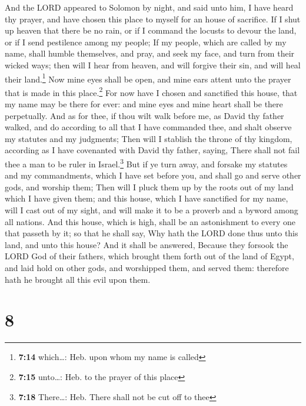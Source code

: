  And the LORD appeared to Solomon by night, and said unto
him, I have heard thy prayer, and have chosen this place to myself for
an house of sacrifice.  If I shut up heaven that there be
no rain, or if I command the locusts to devour the land, or if I send
pestilence among my people;  If my people, which are
called by my name, shall humble themselves, and pray, and seek my face,
and turn from their wicked ways; then will I hear from heaven, and will
forgive their sin, and will heal their land.\footnote{\textbf{7:14}
  which\ldots: Heb. upon whom my name is called}  Now
mine eyes shall be open, and mine ears attent unto the prayer that is
made in this place.\footnote{\textbf{7:15} unto\ldots: Heb. to the
  prayer of this place}  For now have I chosen and
sanctified this house, that my name may be there for ever: and mine eyes
and mine heart shall be there perpetually.  And as for
thee, if thou wilt walk before me, as David thy father walked, and do
according to all that I have commanded thee, and shalt observe my
statutes and my judgments;  Then will I stablish the
throne of thy kingdom, according as I have covenanted with David thy
father, saying, There shall not fail thee a man to be ruler in
Israel.\footnote{\textbf{7:18} There\ldots: Heb. There shall not be cut
  off to thee}  But if ye turn away, and forsake my
statutes and my commandments, which I have set before you, and shall go
and serve other gods, and worship them;  Then will I
pluck them up by the roots out of my land which I have given them; and
this house, which I have sanctified for my name, will I cast out of my
sight, and will make it to be a proverb and a byword among all nations.
 And this house, which is high, shall be an astonishment
to every one that passeth by it; so that he shall say, Why hath the LORD
done thus unto this land, and unto this house?  And it
shall be answered, Because they forsook the LORD God of their fathers,
which brought them forth out of the land of Egypt, and laid hold on
other gods, and worshipped them, and served them: therefore hath he
brought all this evil upon them.

\hypertarget{section-7}{%
\section{8}\label{section-7}}

